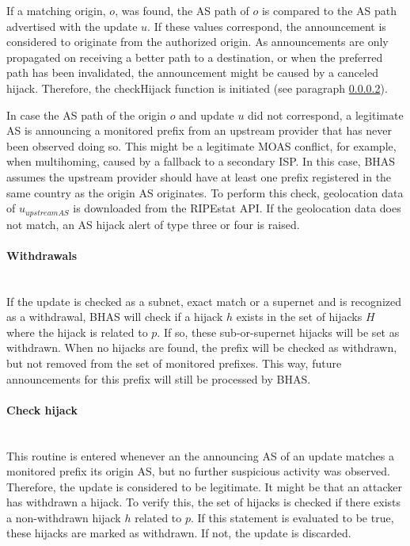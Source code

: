 If a matching origin, $o$, was found, the AS path of $o$ is compared to the AS path advertised with the update $u$. If these values correspond, the announcement is considered to originate from the authorized origin. As announcements are only propagated on receiving a better path to a destination, or when the preferred path has been invalidated, the announcement might be caused by a canceled hijack. Therefore, the checkHijack function is initiated (see paragraph \ref{par:checkhijack}).\par

In case the AS path of the origin $o$ and update $u$ did not correspond, a legitimate AS is announcing a monitored prefix from an upstream provider that has never been observed doing so. This might be a legitimate MOAS conflict, for example, when multihoming, caused by a fallback to a secondary ISP. In this case, BHAS assumes the upstream provider should have at least one prefix registered in the same country as the origin AS originates. To perform this check, geolocation data of $u_{upstreamAS}$ is downloaded from the RIPEstat API. If the geolocation data does not match, an AS hijack alert of type three or four is raised.

\paragraph{Withdrawals}\label{par:withdrawals}\mbox{}\\
If the update is checked as a subnet, exact match or a supernet and is recognized as a withdrawal, BHAS will check if a hijack $h$ exists in the set of hijacks $H$ where the hijack is related to $p$. If so, these sub-or-supernet hijacks will be set as withdrawn. When no hijacks are found, the prefix will be checked as withdrawn, but not removed from the set of monitored prefixes. This way, future announcements for this prefix will still be processed by BHAS.

\paragraph{Check hijack}\label{par:checkhijack}\mbox{}\\
This routine is entered whenever an the announcing AS of an update matches a monitored prefix its origin AS, but no further suspicious activity was observed. Therefore, the update is considered to be legitimate. It might be that an attacker has withdrawn a hijack. To verify this, the set of hijacks is checked if there exists a non-withdrawn hijack $h$ related to $p$. If this statement is evaluated to be true, these hijacks are marked as withdrawn. If not, the update is discarded.


